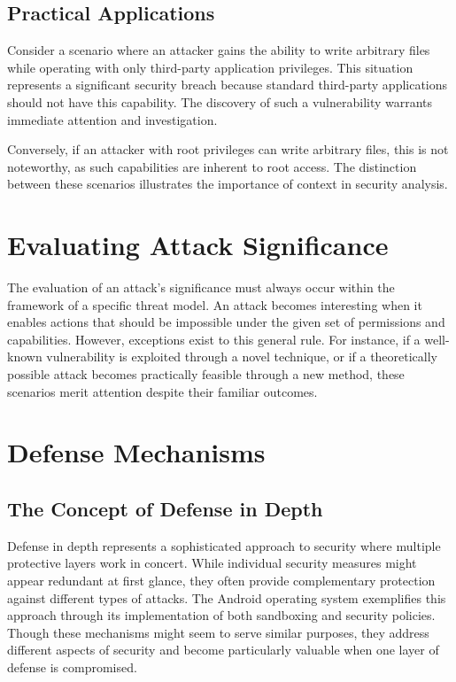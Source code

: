 \documentclass{article}
\begin{document}
\subsection{Practical Applications}
Consider a scenario where an attacker gains the ability to write arbitrary files while operating with only third-party application privileges. This situation represents a significant security breach because standard third-party applications should not have this capability. The discovery of such a vulnerability warrants immediate attention and investigation.

Conversely, if an attacker with root privileges can write arbitrary files, this is not noteworthy, as such capabilities are inherent to root access. The distinction between these scenarios illustrates the importance of context in security analysis.

\section{Evaluating Attack Significance}
The evaluation of an attack's significance must always occur within the framework of a specific threat model. An attack becomes interesting when it enables actions that should be impossible under the given set of permissions and capabilities. However, exceptions exist to this general rule. For instance, if a well-known vulnerability is exploited through a novel technique, or if a theoretically possible attack becomes practically feasible through a new method, these scenarios merit attention despite their familiar outcomes.

\section{Defense Mechanisms}
\subsection{The Concept of Defense in Depth}
Defense in depth represents a sophisticated approach to security where multiple protective layers work in concert. While individual security measures might appear redundant at first glance, they often provide complementary protection against different types of attacks. The Android operating system exemplifies this approach through its implementation of both sandboxing and security policies. Though these mechanisms might seem to serve similar purposes, they address different aspects of security and become particularly valuable when one layer of defense is compromised.
\end{document}
